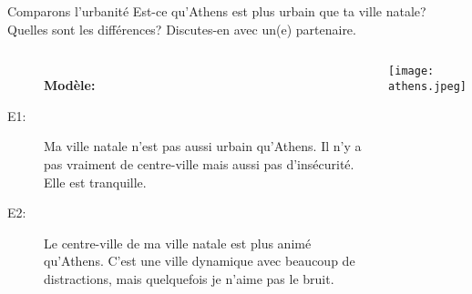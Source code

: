 \begin{frame}{Comparons l'urbanité}
  Est-ce qu'Athens est plus urbain que ta ville natale?
  Quelles sont les différences?
  Discutes-en avec un(e) partenaire.
  \begin{columns}
      \small
      \begin{description}
        \item[] \textbf{Modèle:}
        \item[E1:] Ma ville natale n'est pas aussi urbain qu'Athens. Il n'y a pas vraiment de centre-ville mais aussi pas d'insécurité. Elle est tranquille.
        \item[E2:] Le centre-ville de ma ville natale est plus animé qu'Athens. C'est une ville dynamique avec beaucoup de distractions, mais quelquefois je n'aime pas le bruit.
      \end{description}
      \begin{center}
        \texttt{[image: athens.jpeg]}
      \end{center}
  \end{columns}
\end{frame}